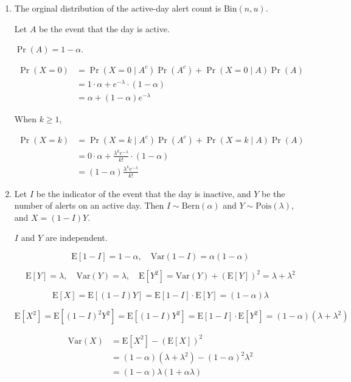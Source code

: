 \documentclass[a4paper]{article}
\newcommand{\E}{\mathrm{E}}
\newcommand{\Var}{\mathrm{Var}}
\begin{document}
\begin{enumerate}
    \item[(a)]
    
    The orginal distribution of the active-day alert count is $\mathrm{Bin}(n,u)$.

    Let $A$ be the event that the day is active.

    $\Pr(A) = 1 - \alpha$.

    $$
    \begin{aligned}
        \Pr(X = 0)
        &= \Pr(X = 0 \mid A^c)\Pr(A^c) + \Pr(X = 0 \mid A)\Pr(A) \\
        &= 1 \cdot \alpha + e^{-\lambda} \cdot (1 - \alpha) \\
        &= \alpha + (1 - \alpha)e^{-\lambda}
    \end{aligned}
    $$

    When $k \ge 1$,
    
    $$
    \begin{aligned}
        \Pr(X = k)
        &= \Pr(X = k \mid A^c)\Pr(A^c) + \Pr(X = k \mid A)\Pr(A) \\
        &= 0 \cdot \alpha + \frac{\lambda^k e^{-\lambda}}{k!} \cdot (1 - \alpha) \\
        &= (1 - \alpha)\frac{\lambda^k e^{-\lambda}}{k!}
    \end{aligned}
    $$

    \item[(b)]
    
    Let $I$ be the indicator of the event that the day is inactive, and $Y$ be the number of alerts on an active day. Then $I \sim \mathrm{Bern}(\alpha)$ and $Y \sim \mathrm{Pois}(\lambda)$, and $X = (1 - I)Y$.

    $I$ and $Y$ are independent.

    $$
    \E[1 - I] = 1 - \alpha, \quad \Var(1 - I) = \alpha(1 - \alpha)
    $$

    $$
    \E[Y] = \lambda, \quad \Var(Y) = \lambda, \quad \E[Y^2] = \Var(Y) + (\E[Y])^2 = \lambda + \lambda^2
    $$

    $$
    \E[X] = \E[(1 - I)Y] = \E[1 - I] \cdot \E[Y] = (1 - \alpha)\lambda
    $$

    $$
    \E[X^2] = \E[(1 - I)^2 Y^2] = \E[(1 - I) Y^2] = \E[1 - I] \cdot \E[Y^2] = (1 - \alpha)(\lambda + \lambda^2)
    $$

    $$
    \begin{aligned}
        \Var(X)
        &= \E[X^2] - (\E[X])^2 \\ &= (1 - \alpha)(\lambda + \lambda^2) - (1 - \alpha)^2 \lambda^2 \\
        &= (1 - \alpha)\lambda(1 + \alpha\lambda)
    \end{aligned}
    $$


\end{enumerate}
\end{document}
